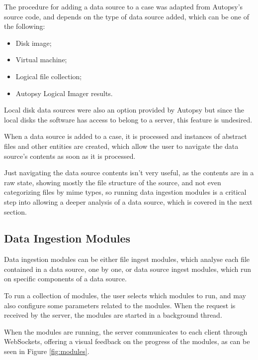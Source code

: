 The procedure for adding a data source to a case was adapted from Autopsy's source code, and depends on the type of data source added, which can be one of the following:
\begin{itemize}
 \item Disk image;
 \item Virtual machine;
 \item Logical file collection;
 \item Autopsy Logical Imager \cite{imager} results.
\end{itemize}

Local disk data sources were also an option provided by Autopsy but since the local disks the software has access to belong to a server, this feature is undesired.

When a data source is added to a case, it is processed and instances of abstract files and other entities are created, which allow the user to navigate the data source's contents as soon as it is processed.

Just navigating the data source contents isn't very useful, as the contents are in a raw state, showing mostly the file structure of the source, and not even categorizing files by \acrshort{mime} types, so running data
ingestion modules is a critical step into allowing a deeper analysis of a data source, which is covered in the next section.

\subsection{Data Ingestion Modules}

Data ingestion modules can be either file ingest modules, which analyse each file contained in a data source, one by one,
or data source ingest modules, which run on specific components of a data source.

To run a collection of modules, the user selects which modules to run, and may also configure some parameters related to the modules. When the request is received by the server, the modules are started in a background thread.

When the modules are running, the server communicates to each client through WebSockets, offering a visual feedback on the progress of the modules, as can be seen in Figure \ref{fig:modules}.

